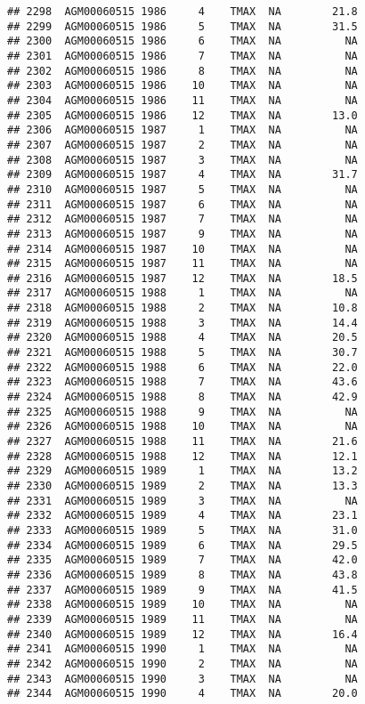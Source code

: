 \documentclass{article}\usepackage[]{graphicx}\usepackage[]{color}
\makeatletter
\newenvironment{kframe}{%
 \def\at@end@of@kframe{}%
 \ifinner\ifhmode%
  \def\at@end@of@kframe{\end{minipage}}%
  \begin{minipage}{\columnwidth}%
 \fi\fi%
 \def\FrameCommand##1{\hskip\@totalleftmargin \hskip-\fboxsep
 \colorbox{shadecolor}{##1}\hskip-\fboxsep
     \hskip-\linewidth \hskip-\@totalleftmargin \hskip\columnwidth}%
 \MakeFramed {\advance\hsize-\width
   \@totalleftmargin\z@ \linewidth\hsize
   \@setminipage}}%
 {\par\unskip\endMakeFramed%
 \at@end@of@kframe}
\newenvironment{knitrout}{}{} %
\makeatother
\begin{document}
\begin{knitrout}
\begin{kframe}
\begin{verbatim}
## 2298  AGM00060515 1986     4    TMAX  NA        21.8
## 2299  AGM00060515 1986     5    TMAX  NA        31.5
## 2300  AGM00060515 1986     6    TMAX  NA          NA
## 2301  AGM00060515 1986     7    TMAX  NA          NA
## 2302  AGM00060515 1986     8    TMAX  NA          NA
## 2303  AGM00060515 1986    10    TMAX  NA          NA
## 2304  AGM00060515 1986    11    TMAX  NA          NA
## 2305  AGM00060515 1986    12    TMAX  NA        13.0
## 2306  AGM00060515 1987     1    TMAX  NA          NA
## 2307  AGM00060515 1987     2    TMAX  NA          NA
## 2308  AGM00060515 1987     3    TMAX  NA          NA
## 2309  AGM00060515 1987     4    TMAX  NA        31.7
## 2310  AGM00060515 1987     5    TMAX  NA          NA
## 2311  AGM00060515 1987     6    TMAX  NA          NA
## 2312  AGM00060515 1987     7    TMAX  NA          NA
## 2313  AGM00060515 1987     9    TMAX  NA          NA
## 2314  AGM00060515 1987    10    TMAX  NA          NA
## 2315  AGM00060515 1987    11    TMAX  NA          NA
## 2316  AGM00060515 1987    12    TMAX  NA        18.5
## 2317  AGM00060515 1988     1    TMAX  NA          NA
## 2318  AGM00060515 1988     2    TMAX  NA        10.8
## 2319  AGM00060515 1988     3    TMAX  NA        14.4
## 2320  AGM00060515 1988     4    TMAX  NA        20.5
## 2321  AGM00060515 1988     5    TMAX  NA        30.7
## 2322  AGM00060515 1988     6    TMAX  NA        22.0
## 2323  AGM00060515 1988     7    TMAX  NA        43.6
## 2324  AGM00060515 1988     8    TMAX  NA        42.9
## 2325  AGM00060515 1988     9    TMAX  NA          NA
## 2326  AGM00060515 1988    10    TMAX  NA          NA
## 2327  AGM00060515 1988    11    TMAX  NA        21.6
## 2328  AGM00060515 1988    12    TMAX  NA        12.1
## 2329  AGM00060515 1989     1    TMAX  NA        13.2
## 2330  AGM00060515 1989     2    TMAX  NA        13.3
## 2331  AGM00060515 1989     3    TMAX  NA          NA
## 2332  AGM00060515 1989     4    TMAX  NA        23.1
## 2333  AGM00060515 1989     5    TMAX  NA        31.0
## 2334  AGM00060515 1989     6    TMAX  NA        29.5
## 2335  AGM00060515 1989     7    TMAX  NA        42.0
## 2336  AGM00060515 1989     8    TMAX  NA        43.8
## 2337  AGM00060515 1989     9    TMAX  NA        41.5
## 2338  AGM00060515 1989    10    TMAX  NA          NA
## 2339  AGM00060515 1989    11    TMAX  NA          NA
## 2340  AGM00060515 1989    12    TMAX  NA        16.4
## 2341  AGM00060515 1990     1    TMAX  NA          NA
## 2342  AGM00060515 1990     2    TMAX  NA          NA
## 2343  AGM00060515 1990     3    TMAX  NA          NA
## 2344  AGM00060515 1990     4    TMAX  NA        20.0

\end{verbatim}
\end{kframe}
\end{knitrout}
\end{document}
